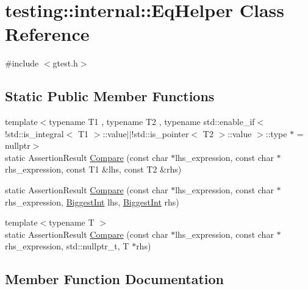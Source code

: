 \hypertarget{classtesting_1_1internal_1_1EqHelper}{}\section{testing\+:\+:internal\+:\+:Eq\+Helper Class Reference}
\label{classtesting_1_1internal_1_1EqHelper}


{\ttfamily \#include $<$gtest.\+h$>$}

\subsection*{Static Public Member Functions}
\begin{DoxyCompactItemize}
\item 
{\footnotesize template$<$typename T1 , typename T2 , typename std\+::enable\+\_\+if$<$!std\+::is\+\_\+integral$<$ T1 $>$\+::value$\vert$$\vert$!std\+::is\+\_\+pointer$<$ T2 $>$\+::value $>$\+::type $\ast$  = nullptr$>$ }\\static Assertion\+Result \hyperlink{classtesting_1_1internal_1_1EqHelper_aa5ee2dafddce2496d73ba13fd34bb981}{Compare} (const char $\ast$lhs\+\_\+expression, const char $\ast$rhs\+\_\+expression, const T1 \&lhs, const T2 \&rhs)
\item 
static Assertion\+Result \hyperlink{classtesting_1_1internal_1_1EqHelper_af7e402f6e00be1486d0f102e9f1bc931}{Compare} (const char $\ast$lhs\+\_\+expression, const char $\ast$rhs\+\_\+expression, \hyperlink{namespacetesting_1_1internal_a05c6bd9ede5ccdf25191a590d610dcc6}{Biggest\+Int} lhs, \hyperlink{namespacetesting_1_1internal_a05c6bd9ede5ccdf25191a590d610dcc6}{Biggest\+Int} rhs)
\item 
{\footnotesize template$<$typename T $>$ }\\static Assertion\+Result \hyperlink{classtesting_1_1internal_1_1EqHelper_af5cac2c28545dfa0688849e205f54bec}{Compare} (const char $\ast$lhs\+\_\+expression, const char $\ast$rhs\+\_\+expression, std\+::nullptr\+\_\+t, T $\ast$rhs)
\end{DoxyCompactItemize}


\subsection{Member Function Documentation}
\mbox{\label{classtesting_1_1internal_1_1EqHelper_aa5ee2dafddce2496d73ba13fd34bb981}} 
